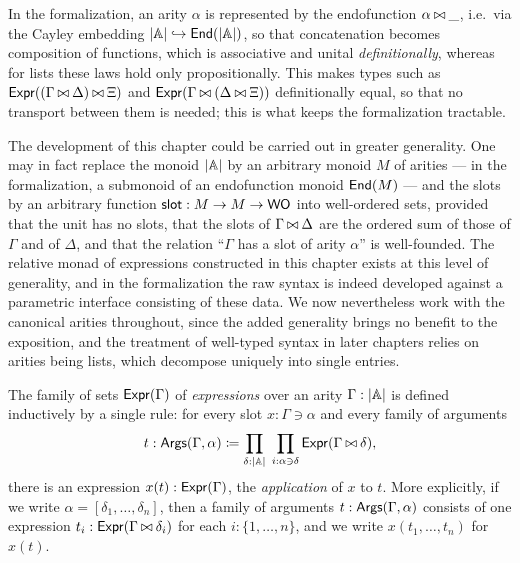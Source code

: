\begin{remark}
    In the formalization, an arity $\alpha$ is represented by the endofunction $\alpha \mathbin{\bowtie} \_$, i.e.\ via the Cayley embedding $\left|\mathbb{A}\right| \hookrightarrow \mathsf{End}(\left|\mathbb{A}\right|)$, so that concatenation becomes composition of functions, which is associative and unital \emph{definitionally}, whereas for lists these laws hold only propositionally. This makes types such as $\mathsf{Expr}((\Gamma \mathbin{\bowtie} \Delta) \mathbin{\bowtie} \Xi)$ and $\mathsf{Expr}(\Gamma \mathbin{\bowtie} (\Delta \mathbin{\bowtie} \Xi))$ definitionally equal, so that no transport between them is needed; this is what keeps the formalization tractable.
\end{remark}

\begin{remark}
    The development of this chapter could be carried out in greater generality. One may in fact replace the monoid $\left|\mathbb{A}\right|$ by an arbitrary monoid $M$ of arities --- in the formalization, a submonoid of an endofunction monoid $\mathsf{End}(M)$ --- and the slots by an arbitrary function $\mathsf{slot} : M \to M \to \mathsf{WO}$ into well-ordered sets, provided that the unit has no slots, that the slots of $\Gamma \mathbin{\bowtie} \Delta$ are the ordered sum of those of $\Gamma$ and of $\Delta$, and that the relation ``$\Gamma$ has a slot of arity $\alpha$'' is well-founded. The relative monad of expressions constructed in this chapter exists at this level of generality, and in the formalization the raw syntax is indeed developed against a parametric interface consisting of these data. We now nevertheless work with the canonical arities throughout, since the added generality brings no benefit to the exposition, and the treatment of well-typed syntax in later chapters relies on arities being lists, which decompose uniquely into single entries.
\end{remark}

\begin{definition}\label{def:expressions}
    The family of sets $\mathsf{Expr}(\Gamma)$ of \emph{expressions} over an arity $\Gamma : \left|\mathbb{A}\right|$ is defined inductively by a single rule: for every slot $x : \Gamma \ni \alpha$ and every family of arguments
    \[
    t : \mathsf{Args}(\Gamma, \alpha) \coloneqq \prod_{\delta : \left|\mathbb{A}\right|} \; \prod_{i : \alpha \ni \delta} \mathsf{Expr}(\Gamma \mathbin{\bowtie} \delta),
    \]
    there is an expression $x(t) : \mathsf{Expr}(\Gamma)$, the \emph{application} of $x$ to $t$. More explicitly, if we write $\alpha = [\delta_1, \ldots, \delta_n]$, then a family of arguments $t : \mathsf{Args}(\Gamma, \alpha)$ consists of one expression $t_i : \mathsf{Expr}(\Gamma \mathbin{\bowtie} \delta_i)$ for each $i : \{1, \ldots, n\}$, and we write $x(t_1, \ldots, t_n)$ for $x(t)$.
\end{definition}

